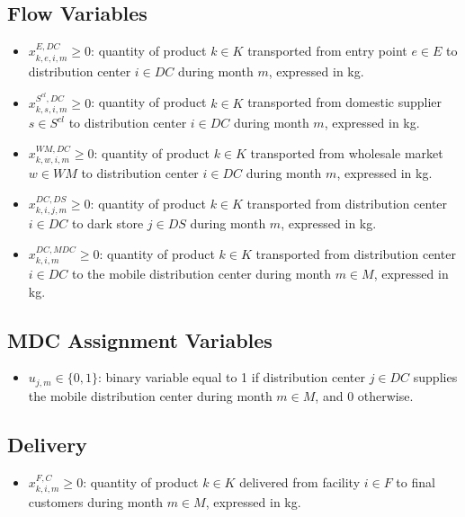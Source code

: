 \documentclass[12pt]{article}
\begin{document}
\subsection{Flow Variables}

\begin{itemize}
    \item $x^{E,DC}_{k,e,i,m} \geq 0$: quantity of product $k \in K$ transported from entry point $e \in E$ to distribution center $i \in DC$ during month $m$, expressed in kg.

    \item $x^{S^{cl},DC}_{k,s,i,m} \geq 0$: quantity of product $k \in K$ transported from domestic supplier $s \in S^{cl}$ to distribution center $i \in DC$ during month $m$, expressed in kg.

    \item $x^{WM,DC}_{k,w,i,m} \geq 0$: quantity of product $k \in K$ transported from wholesale market $w \in WM$ to distribution center $i \in DC$ during month $m$, expressed in kg.

    \item $x^{DC,DS}_{k,i,j,m} \geq 0$: quantity of product $k \in K$ transported from distribution center $i \in DC$ to dark store $j \in DS$ during month $m$, expressed in kg.

    \item $x^{DC,MDC}_{k,i,m} \geq 0$: quantity of product $k \in K$ transported from distribution center $i \in DC$ to the mobile distribution center during month $m \in M$, expressed in kg.
\end{itemize}

\subsection{MDC Assignment Variables}

\begin{itemize}
    \item $u_{j,m} \in \{0,1\}$: binary variable equal to 1 if distribution center $j \in DC$ supplies the mobile distribution center during month $m \in M$, and 0 otherwise.
\end{itemize}

\subsection{Delivery}

\begin{itemize}
    \item $x^{F,C}_{k,i,m} \geq 0$: quantity of product $k \in K$ delivered from facility $i \in F$ to final customers during month $m \in M$, expressed in kg.
\end{itemize}
\end{document}
